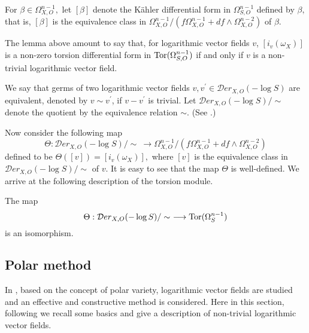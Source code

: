 \documentclass[pdftex]{arxsigma}
\begin{document}
For $ \beta \in \Omega_{X, O}^{n-1}, $ let $ [\beta] $ denote the K\"ahler differential form in $ \Omega_{S, O}^{n-1} $ 
defined by $ \beta, $ that is, $ [\beta] $ is the equivalence class in 
$ \Omega_{X, O}^{n-1} /(f \Omega_{X, O}^{n-1} + df \wedge \Omega_{X, O}^{n-2}) $ of $ \beta. $ 


The lemma above amount to say that, for logarithmic vector fields $v$, 
 $ [i_{v}(\omega_X)] $ is a non-zero torsion differential form 
in $ {\rm Tor}(\Omega_{S,O}^{n-1}) $ if and only if $ v $ is a non-trivial logarithmic vector field.



We say that germs of two logarithmic vector fields $ v, v^{\prime} \in  {\mathcal Der}_{X, O}(-\log S) $ are 
equivalent, denoted by $ v \sim v^{\prime} $, if $ v-v^{\prime} $ is trivial. 
Let $ {\mathcal Der}_{X, O}(-\log S)/\sim $ denote the quotient by the equivalence relation $ \sim $. (See  \cite{T}.)

Now consider the following map
\begin{equation*}
 \Theta:  {\mathcal Der}_{X, O}(-\log S)/\sim \ \longrightarrow  
\Omega_{X, O}^{n-1} /(f \Omega_{X, O}^{n-1} + df \wedge \Omega_{X, O}^{n-2}) 
\end{equation*}
defined to be $ \Theta([v]) = [i_{v}(\omega_X)], $ where $ [v] $  is the equivalence class in \\
$ {\mathcal Der}_{X, O}(-\log S)/\sim $ 
of $ v. $ It is easy to see that the map $ \Theta $ is well-defined. 
We arrive at the following description of the torsion module.

\begin{theorem}
The map 
\begin{equation*}
\Theta :  {\mathcal Der}_{X, O}(-\log S)/\sim \ \longrightarrow  {\rm Tor}(\Omega_{S}^{n-1}) 
\end{equation*}
is an isomorphism.
\end{theorem}

\subsection{Polar method}


In \cite{T}, based on the concept of polar variety,  logarithmic vector fields are studied and an effective and constructive method is considered. Here in this section, following \cite{NT19a, T} we recall some basics and give a description of non-trivial logarithmic vector fields.
\end{document}
